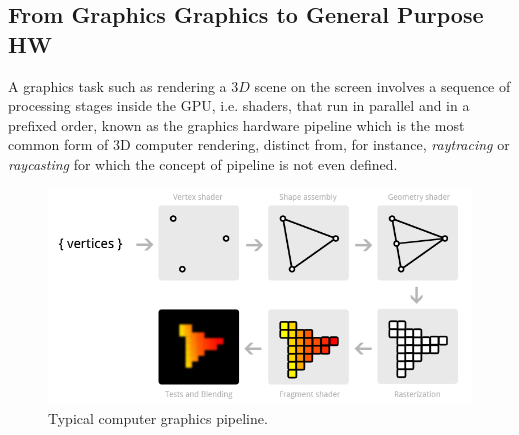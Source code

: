 \begin{description}
    \subsection{From Graphics Graphics to General Purpose HW}\label{sec:graphicPipeline}
    A graphics task such as rendering a $3D$ scene on the screen
    involves a sequence of processing stages inside the GPU, i.e. shaders, that run in parallel and in a prefixed order, known as the graphics hardware
    pipeline \cite{Shirley:2005:FCG:1088893} which is the most common form of 3D computer rendering, distinct from, for instance, \textit{raytracing} or \textit{raycasting} for which the concept of pipeline is not even defined.
     \begin{figure}[H]
    	\centering
    	\caption{Typical computer graphics pipeline.}\label{fig:graphicPipeline}
    	\includegraphics[width=1.0\textwidth]{./images/parallel_programming/pipeline}
    \end{figure}
    

\end{description}
